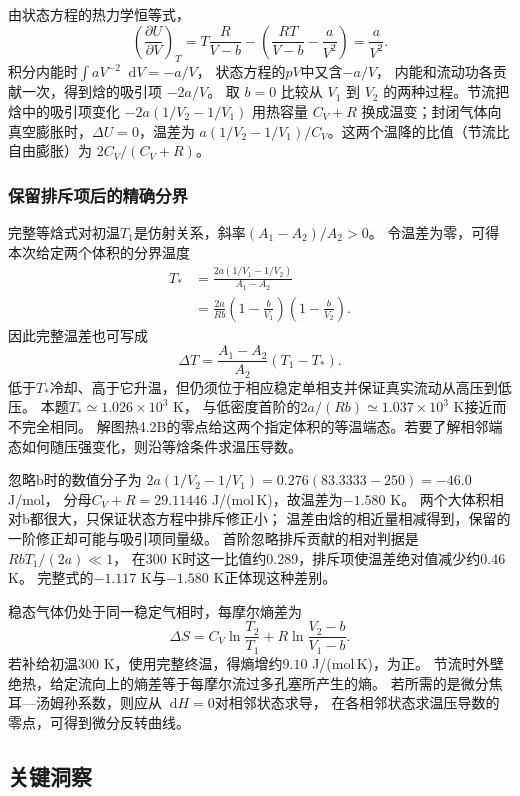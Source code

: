\documentclass[UTF8,fontset=fandol,a4paper,11pt]{ctexart}
\newcommand{\dd}{\mathop{}\!\mathrm{d}}
\begin{document}
由状态方程的热力学恒等式，
\[
\left(\frac{\partial U}{\partial V}\right)_T
=T\frac R{V-b}-\left(\frac{RT}{V-b}-\frac a{V^2}\right)
=\frac a{V^2}.
\]
积分内能时$\int aV^{-2}\dd V=-a/V$，
状态方程的$pV$中又含$-a/V$，
内能和流动功各贡献一次，得到焓的吸引项 $-2a/V$。
取 $b=0$ 比较从 $V_1$ 到 $V_2$ 的两种过程。节流把焓中的吸引项变化 $-2a(1/V_2-1/V_1)$ 用热容量 $C_V+R$ 换成温变；封闭气体向真空膨胀时，$\Delta U=0$，温差为 $a(1/V_2-1/V_1)/C_V$。这两个温降的比值（节流比自由膨胀）为 $2C_V/(C_V+R)$。

\subsubsection*{保留排斥项后的精确分界}
完整等焓式对初温$T_1$是仿射关系，斜率$(A_1-A_2)/A_2>0$。
令温差为零，可得本次给定两个体积的分界温度
\[
\begin{aligned}
T_*&=\frac{2a(1/V_1-1/V_2)}{A_1-A_2}\\
&=\frac{2a}{Rb}
\left(1-\frac b{V_1}\right)
\left(1-\frac b{V_2}\right).
\end{aligned}
\]
因此完整温差也可写成
\[
\Delta T=\frac{A_1-A_2}{A_2}(T_1-T_*).
\]
低于$T_*$冷却、高于它升温，但仍须位于相应稳定单相支并保证真实流动从高压到低压。
本题$T_*\simeq1.026\times10^3$ K，
与低密度首阶的$2a/(Rb)\simeq1.037\times10^3$ K接近而不完全相同。
解图热4.2B的零点给这两个指定体积的等温端态。若要了解相邻端态如何随压强变化，则沿等焓条件求温压导数。

忽略b时的数值分子为
$2a(1/V_2-1/V_1)=0.276(83.3333-250)=-46.0$ J/mol，
分母$C_V+R=29.11446$ J/(mol\,K)，故温差为$-1.580$ K。
两个大体积相对b都很大，只保证状态方程中排斥修正小；
温差由焓的相近量相减得到，保留的一阶修正却可能与吸引项同量级。
首阶忽略排斥贡献的相对判据是$RbT_1/(2a)\ll1$，
在300 K时这一比值约0.289，排斥项使温差绝对值减少约0.46 K。
完整式的$-1.117$ K与$-1.580$ K正体现这种差别。

稳态气体仍处于同一稳定气相时，每摩尔熵差为
\[
\Delta S=C_V\ln\frac{T_2}{T_1}
+R\ln\frac{V_2-b}{V_1-b}.
\]
若补给初温300 K，使用完整终温，得熵增约$9.10$ J/(mol\,K)，为正。
节流时外壁绝热，给定流向上的熵差等于每摩尔流过多孔塞所产生的熵。
若所需的是微分焦耳—汤姆孙系数，则应从$\dd H=0$对相邻状态求导，
在各相邻状态求温压导数的零点，可得到微分反转曲线。




\subsection*{关键洞察}
\end{document}
